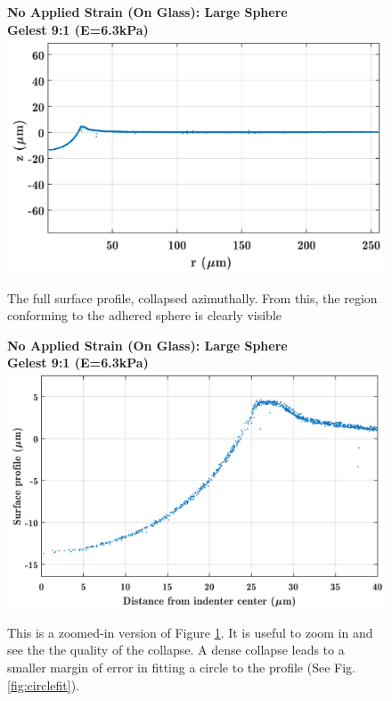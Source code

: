 \begin{figure}[h!]
	\centering
	\large \textbf{No Applied Strain (On Glass): Large Sphere}\\ \vspace{.4 em}
	\large \textbf{Gelest 9:1 (E=6.3kPa)}
	\includegraphics[width=\linewidth]{Chapters/Figures/sphere011_ia/side_collapsed}
	\caption[Collapsed Side Profile]{The full surface profile, collapsed azimuthally. From this, the region conforming to the adhered sphere is clearly visible}
	\label{fig:sidecollapsed}
\end{figure}
\begin{figure}[h!]
	\centering
	\large \textbf{No Applied Strain (On Glass): Large Sphere}\\ \vspace{.4 em}
	\large \textbf{Gelest 9:1 (E=6.3kPa)}
	\includegraphics[width=\linewidth]{Chapters/Figures/sphere011_ia/side_collapsed_zoomed}
	\caption[Collapsed Side Profile: Zoomed]{This is a zoomed-in version of Figure \ref{fig:sidecollapsed}. It is useful to zoom in and see the the quality of the collapse. A dense collapse leads to a smaller margin of error in fitting a circle to the profile (See Fig. \ref{fig:circlefit}).}
	\label{fig:sidecollapsedzoomed}
\end{figure}

